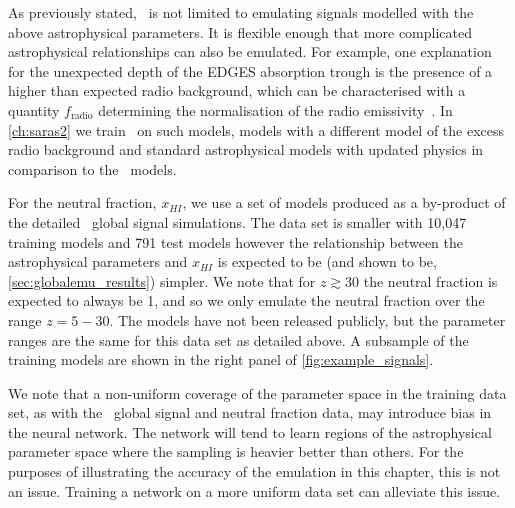 As previously stated, \name~is not limited to emulating signals modelled with the above astrophysical parameters. It is flexible enough that more complicated astrophysical relationships can also be emulated. For example, one explanation for the unexpected depth of the EDGES absorption trough is the presence of a higher than expected radio background, which can be characterised with a quantity $f_\mathrm{radio}$ determining the normalisation of the radio emissivity~\citep[assuming the source of the excess radio background is stellar,][]{Reis2020}. In \cref{ch:saras2} we train \name~on such models, models with a different model of the excess radio background and standard astrophysical models with updated physics in comparison to the \cmGEM~models. %

For the neutral fraction, $x_{HI}$, we use a set of models produced as a by-product of the detailed \cmGEM~global signal simulations. The data set is smaller with 10,047 training models and 791 test models however the relationship between the astrophysical parameters and $x_{HI}$ is expected to be (and shown to be, \cref{sec:globalemu_results}) simpler. We note that for $z \gtrsim 30$ the neutral fraction is expected to always be 1, and so we only emulate the neutral fraction over the range $z=5-30$. The models have not been released publicly, but the parameter ranges are the same for this data set as detailed above. A subsample of the training models are shown in the right panel of \cref{fig:example_signals}.

We note that a non-uniform coverage of the parameter space in the training data set, as with the \cmGEM~global signal and neutral fraction data, may introduce bias in the neural network. The network will tend to learn regions of the astrophysical parameter space where the sampling is heavier better than others. For the purposes of illustrating the accuracy of the emulation in this chapter, this is not an issue. %
Training a network on a more uniform data set can alleviate this issue.

